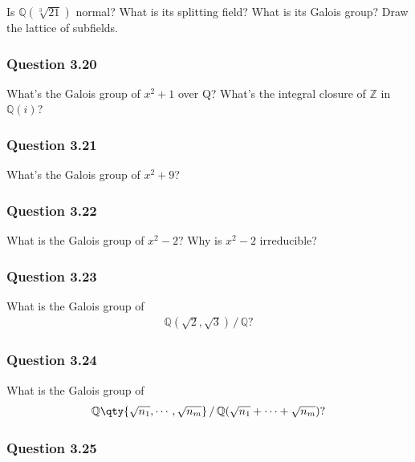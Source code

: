 Is \({\mathbb{Q}}(\sqrt[3]{21})\) normal? What is its splitting field?
What is its Galois group? Draw the lattice of subfields.

\hypertarget{question-3.20}{%
\subsubsection{Question 3.20}\label{question-3.20}}

What's the Galois group of \(x^2 + 1\) over Q? What's the integral
closure of \({\mathbb{Z}}\) in \({\mathbb{Q}}(i)\)?

\hypertarget{question-3.21}{%
\subsubsection{Question 3.21}\label{question-3.21}}

What's the Galois group of \(x^2 + 9\)?

\hypertarget{question-3.22}{%
\subsubsection{Question 3.22}\label{question-3.22}}

What is the Galois group of \(x^2 - 2\)? Why is \(x^2 - 2\) irreducible?

\hypertarget{question-3.23}{%
\subsubsection{Question 3.23}\label{question-3.23}}

What is the Galois group of
\begin{align*}
{\mathbb{Q}}(\sqrt 2, \sqrt 3)\, / \, {\mathbb{Q}}
?\end{align*}

\hypertarget{question-3.24}{%
\subsubsection{Question 3.24}\label{question-3.24}}

What is the Galois group of
\begin{align*}
{\mathbb{Q}}\qty{ \sqrt{n_1}, \cdots, \sqrt{n_m} } \, / \, {\mathbb{Q}}(\sqrt{n_1} + \cdots + \sqrt{n_m})
?\end{align*}

\hypertarget{question-3.25}{%
\subsubsection{Question 3.25}\label{question-3.25}}

